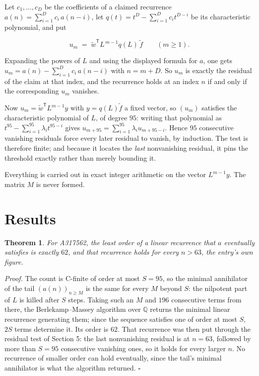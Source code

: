 \documentclass[11pt]{article}
\newtheorem{theorem}{Theorem}
\theoremstyle{definition}
\begin{document}
Let $c_1,\dots,c_D$ be the coefficients of a claimed recurrence $a(n) = \sum_{i=1}^{D} c_i\,a(n-i)$, let $q(t) = t^{D} - \sum_{i=1}^{D} c_i t^{D-i}$ be its characteristic polynomial, and put

\[u_m \;=\; \tilde w^{\mathsf T} L^{\,m-1} q(L)\,\tilde f \qquad (m \ge 1).\]

Expanding the powers of $L$ and using the displayed formula for $a$, one gets $u_m = a(n) - \sum_{i=1}^{D} c_i\,a(n-i)$ with $n = m + D$. So $u_m$ is exactly the residual of the claim at that index, and the recurrence holds at an index $n$ if and only if the corresponding $u_m$ vanishes.

Now $u_m = \tilde w^{\mathsf T} L^{m-1} y$ with $y = q(L)\tilde f$ a fixed vector, so $(u_m)$ satisfies the characteristic polynomial of $L$, of degree $95$: writing that polynomial as $t^{95} - \sum_{i=1}^{95} \lambda_i t^{95-i}$ gives $u_{m+95} = \sum_{i=1}^{95} \lambda_i u_{m+95-i}$. Hence $95$ consecutive vanishing residuals force every later residual to vanish, by induction. The test is therefore finite; and because it locates the {\itshape last} nonvanishing residual, it pins the threshold exactly rather than merely bounding it.

Everything is carried out in exact integer arithmetic on the vector $L^{m-1}y$. The matrix $M$ is never formed.

\section{Results}

\begin{theorem} For A317562, the least order of a linear recurrence that $a$ eventually satisfies is exactly $62$, and that recurrence holds for every $n > 63$, the entry's own figure.\end{theorem}

{\itshape Proof.} The count is C-finite of order at most $S = 95$, so the minimal annihilator of the tail $(a(n))_{n \ge M}$ is the same for every $M$ beyond $S$: the nilpotent part of $L$ is killed after $S$ steps. Taking such an $M$ and $196$ consecutive terms from there, the Berlekamp--Massey algorithm over $\mathbb{Q}$ returns the minimal linear recurrence generating them; since the sequence satisfies one of order at most $S$, $2S$ terms determine it. Its order is $62$. That recurrence was then put through the residual test of Section 5: the last nonvanishing residual is at $n = 63$, followed by more than $S = 95$ consecutive vanishing ones, so it holds for every larger $n$. No recurrence of smaller order can hold eventually, since the tail's minimal annihilator is what the algorithm returned. $\square$
\end{document}

